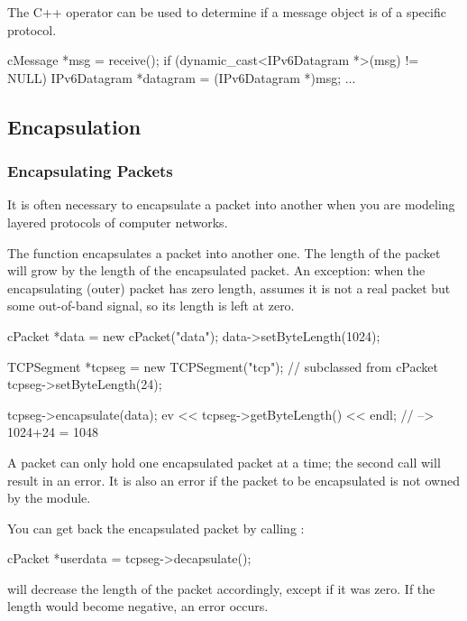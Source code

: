 The C++  operator can be used to determine
if a message object is of a specific protocol.

\begin{cpp}
cMessage *msg = receive();
if (dynamic_cast<IPv6Datagram *>(msg) != NULL)
{
    IPv6Datagram *datagram = (IPv6Datagram *)msg;
    ...
}
\end{cpp}


\subsection{Encapsulation}

\subsubsection{Encapsulating Packets}

It is often necessary to encapsulate a packet
into another when you are modeling layered protocols of computer networks.

The  function encapsulates a packet
into another one. The length of the packet will grow by the length of
the encapsulated packet. An exception: when the encapsulating (outer)
packet has zero length, {\opp} assumes it is not a real packet but
some out-of-band signal, so its length is left at zero.

\begin{cpp}
cPacket *data = new cPacket("data");
data->setByteLength(1024);

TCPSegment *tcpseg = new TCPSegment("tcp"); // subclassed from cPacket
tcpseg->setByteLength(24);

tcpseg->encapsulate(data);
ev << tcpseg->getByteLength() << endl; // --> 1024+24 = 1048
\end{cpp}

A packet can only hold one encapsulated packet at a time; the
second  call will result in an error. It is also
an error if the packet to be encapsulated is not owned by the
module.

You can get back the encapsulated packet by calling :

\begin{cpp}
cPacket *userdata = tcpseg->decapsulate();
\end{cpp}

 will decrease the length of the packet accordingly,
except if it was zero. If the length would become negative, an
error occurs.

